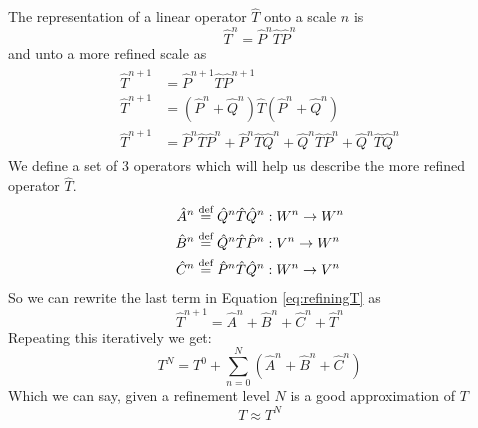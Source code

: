 \documentclass[../master_thesis.tex]{subfiles}
\begin{document}
The representation of a linear operator $\hat{T}$ onto a scale $n$ is
\begin{equation}\label{eq:PTP}
  \hat{T}^n = \hat{P}^n\hat{T}\hat{P}^n
\end{equation}
and unto a more refined scale as
\begin{align}\label{eq:refiningT}
  \begin{split}
    \hat{T}^{n+1} &= \hat{P}^{n+1}\hat{T}\hat{P}^{n+1}\\
    \hat{T}^{n+1} &= (\hat{P}^n + \hat{Q}^n)\hat{T}(\hat{P}^n + \hat{Q}^n)\\
    \hat{T}^{n+1} &= \hat{P}^n\hat{T}\hat{P}^n + \hat{P}^n\hat{T}\hat{Q}^n + \hat{Q}^n\hat{T}\hat{P}^n + \hat{Q}^n\hat{T}\hat{Q}^n
  \end{split}
\end{align}
We define a set of 3 operators which will help us describe the more refined operator
$\hat{T}$.
\begin{align}
  \hat{A}^n & \stackrel{\text{def}}{=}\hat{Q}^n\hat{T}\hat{Q}^n: W^n \to W^n\\
  \hat{B}^n & \stackrel{\text{def}}{=}\hat{Q}^n\hat{T}\hat{P}^n: V^n \to W^n\\
  \hat{C}^n & \stackrel{\text{def}}{=}\hat{P}^n\hat{T}\hat{Q}^n: W^n \to V^n
\end{align}
So we can rewrite the last term in Equation \ref{eq:refiningT} as
\begin{equation}\label{eq:refineT}
  \hat{T}^{n+1} =\hat{A}^n + \hat{B}^n + \hat{C}^n + \hat{T}^n
\end{equation}
Repeating this iteratively we get:
\begin{equation}\label{eq:}
  T^N = T^0 + \sum^N_{n=0}\left( \hat{A}^n + \hat{B}^n + \hat{C}^n\right)
\end{equation}
Which we can say, given a refinement level $N$ is a good approximation of $T$
\begin{equation}
  T \approx T^N
\end{equation}
\end{document}
